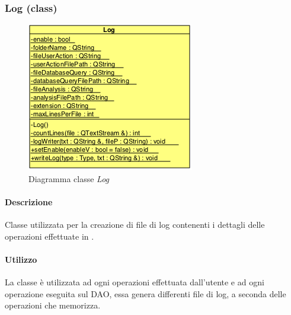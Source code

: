\subsubsection{Log (class)}
\label{spelog}
\begin{figure}[!h]
\centering
			\includegraphics[scale=0.75]{./Content/Immagini/model/Log.png}
			\caption{Diagramma classe \textsl{Log}}
			\label{cl_log}
\end{figure}
\paragraph{Descrizione \\}
Classe utilizzata per la creazione di file di log contenenti i dettagli delle operazioni effettuate in \project{}.
\paragraph{Utilizzo\\}
La classe è utilizzata ad ogni operazioni effettuata dall'utente e ad ogni operazione eseguita sul DAO, essa genera differenti file di log, a seconda delle operazioni che memorizza.
